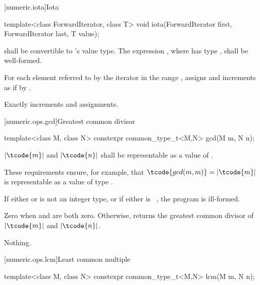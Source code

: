 [numeric.iota]{Iota}

%
\begin{itemdecl}
template<class ForwardIterator, class T>
  void iota(ForwardIterator first, ForwardIterator last, T value);
\end{itemdecl}

\begin{itemdescr}
\pnum
\requires
{} shall be convertible to 's value type.
The expression , where  has type ,
shall be well-formed.

\pnum
\effects
For each element referred to by the iterator 
in the range ,
assigns  and increments 
as if by .

\pnum
\complexity
Exactly  increments and assignments.
\end{itemdescr}

[numeric.ops.gcd]{Greatest common divisor}

%
\begin{itemdecl}
template<class M, class N>
  constexpr common_type_t<M,N> gcd(M m, N n);
\end{itemdecl}

\begin{itemdescr}
\pnum
\requires
$|\tcode{m}|$ and $|\tcode{n}|$
shall be representable as a value of .
\begin{note}
These requirements ensure, for example,
that $\tcode{gcd(m, m)} = |\tcode{m}|$
is representable as a value of type .
\end{note}

\pnum
\remarks
If either  or  is not an integer type, or
if either is \cv{}~, the program is ill-formed.

\pnum
\returns
Zero when  and  are both zero. Otherwise,
returns the greatest common divisor of $|\tcode{m}|$ and $|\tcode{n}|$.

\pnum
\throws
Nothing.
\end{itemdescr}

[numeric.ops.lcm]{Least common multiple}

%
\begin{itemdecl}
template<class M, class N>
  constexpr common_type_t<M,N> lcm(M m, N n);
\end{itemdecl}

